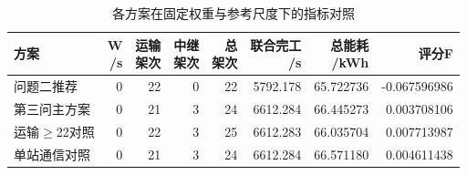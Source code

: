 \begin{table}[!htbp]
\centering
\footnotesize
\setlength{\tabcolsep}{3pt}
\renewcommand{\arraystretch}{1.10}
\caption{各方案在固定权重与参考尺度下的指标对照}\label{tab:q3-comparison}
\begin{tabular}{@{}lrrrrrrr@{}}
\toprule
方案 & \shortstack{W\\/s} & \shortstack{运输\\架次} & \shortstack{中继\\架次} & \shortstack{总\\架次} & \shortstack{联合完工\\/s} & \shortstack{总能耗\\/kWh} & 评分F \\
\midrule
问题二推荐 & 0 & 22 & 0 & 22 & 5792.178 & 65.722736 & -0.067596986 \\
第三问主方案 & 0 & 21 & 3 & 24 & 6612.284 & 66.445273 & 0.003708106 \\
运输$\ge$22对照 & 0 & 22 & 3 & 25 & 6612.283 & 66.035704 & 0.007713987 \\
单站通信对照 & 0 & 21 & 3 & 24 & 6612.284 & 66.571180 & 0.004611438 \\
\bottomrule
\end{tabular}
\end{table}

